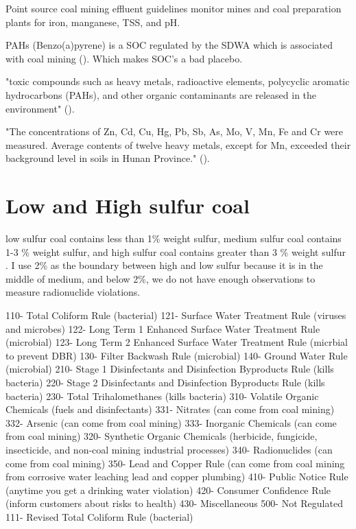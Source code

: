\documentclass{article}
\begin{document}
Point source coal mining effluent guidelines monitor mines and coal preparation plants for iron, manganese, TSS, and pH.

PAHs (Benzo(a)pyrene) is a SOC regulated by the SDWA which is associated with coal mining (\cite{boente2020benzo}). Which makes SOC's a bad placebo.

"toxic compounds such as heavy metals, radioactive elements, polycyclic aromatic hydrocarbons (PAHs), and other organic contaminants are released in the environment" (\cite{rouhani2023overview}).

"The concentrations of Zn, Cd, Cu, Hg, Pb, Sb, As,
Mo, V, Mn, Fe and Cr were measured. Average contents of twelve heavy metals, except for Mn, exceeded their background level in soils in
Hunan Province." (\cite{liang2017spatial}).

\section{Low and High sulfur coal}
low sulfur coal contains less than 1\% weight sulfur, medium sulfur coal contains 1-3 \% weight sulfur, and high sulfur coal contains greater than 3 \% weight sulfur \cite{schweinfurth2009introduction}. I use 2\% as the boundary between high and low sulfur because it is in the middle of medium, and below 2\%, we do not have enough observations to measure radionuclide violations.

110- Total Coliform Rule (bacterial)
121- Surface Water Treatment Rule (viruses and microbes)
122- Long Term 1 Enhanced Surface Water Treatment Rule (microbial)
123- Long Term 2 Enhanced Surface Water Treatment Rule (micrbial to prevent DBR)
130- Filter Backwash Rule (microbial)
140- Ground Water Rule (microbial)
210- Stage 1 Disinfectants and Disinfection Byproducts Rule (kills bacteria)
220- Stage 2 Disinfectants and Disinfection Byproducts Rule (kills bacteria)
230- Total Trihalomethanes (kills bacteria)
310- Volatile Organic Chemicals (fuels and disinfectants)
331- Nitrates (can come from coal mining)
332- Arsenic (can come from coal mining)
333- Inorganic Chemicals (can come from coal mining)
320- Synthetic Organic Chemicals (herbicide, fungicide, insecticide, and non-coal mining industrial processes)
340- Radionuclides (can come from coal mining)
350- Lead and Copper Rule (can come from coal mining from corrosive water leaching lead and copper plumbing)
410- Public Notice Rule (anytime you get a drinking water violation)
420- Consumer Confidence Rule (inform customers about risks to health)
430- Miscellaneous
500- Not Regulated
111- Revised Total Coliform Rule (bacterial)
\end{document}
